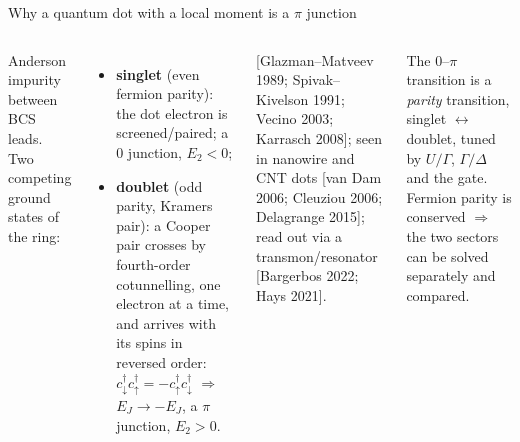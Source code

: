 \documentclass[aspectratio=169,9pt]{beamer}
\renewcommand{\cite}[1]{{\scriptsize\textcolor{ink!60}{[#1]}}}
\begin{document}
\begin{frame}{Why a quantum dot with a local moment is a $\pi$ junction}
  \begin{columns}[T]
    \small Anderson impurity between BCS leads. Two competing ground states of the ring:
    \begin{itemize}\small
      \item \textbf{singlet} (even fermion parity): the dot electron is screened/paired; a $0$ junction, $E_2<0$;
      \item \textbf{doublet} (odd parity, Kramers pair): a Cooper pair crosses by fourth-order cotunnelling, one
            electron at a time, and arrives with its spins in \alert{reversed order}:
            $c^\dagger_\downarrow c^\dagger_\uparrow=-c^\dagger_\uparrow c^\dagger_\downarrow$ $\Rightarrow$ $E_J\to-E_J$, a $\pi$ junction, $E_2>0$.
    \end{itemize}
    \small \cite{Glazman--Matveev 1989; Spivak--Kivelson 1991; Vecino 2003; Karrasch 2008}; seen in nanowire and CNT dots
    \cite{van Dam 2006; Cleuziou 2006; Delagrange 2015}; read out via a transmon/resonator \cite{Bargerbos 2022; Hays 2021}.
    \centering
    \begin{keybox}
      \small The $0$--$\pi$ transition is a \emph{parity} transition, singlet $\leftrightarrow$ doublet, tuned by
      $U/\Gamma$, $\Gamma/\Delta$ and the gate. Fermion parity is conserved $\Rightarrow$ the two sectors can be
      solved separately and compared.
    \end{keybox}
  \end{columns}
\end{frame}
\end{document}
